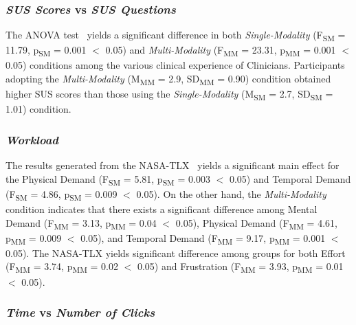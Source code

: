 \subsubsection{\textit{SUS Scores} vs \textit{SUS Questions}}

The ANOVA test\footnotemark[3]~\cite{Wobbrock:2011:ART:1978942.1978963} yields a significant difference in both \textit{Single-Modality} (F\textsubscript{SM} = 11.79, p\textsubscript{SM} = 0.001 $<$ 0.05) and \textit{Multi-Modality} (F\textsubscript{MM} = 23.31, p\textsubscript{MM} = 0.001 $<$ 0.05) conditions among the various clinical experience of Clinicians.
Participants adopting the \textit{Multi-Modality} (M\textsubscript{MM} = 2.9, SD\textsubscript{MM} = 0.90) condition obtained higher SUS scores than those using the \textit{Single-Modality} (M\textsubscript{SM} = 2.7, SD\textsubscript{SM} = 1.01) condition.


\subsubsection{\textit{Workload}}

The results generated from the NASA-TLX~\cite{10.1145/3290605.3300592} yields a significant main effect for the Physical Demand (F\textsubscript{SM} = 5.81, p\textsubscript{SM} = 0.003 $<$ 0.05) and Temporal Demand (F\textsubscript{SM} = 4.86, p\textsubscript{SM} = 0.009 $<$ 0.05).
On the other hand, the \textit{Multi-Modality} condition indicates that there exists a significant difference among Mental Demand (F\textsubscript{MM} = 3.13, p\textsubscript{MM} = 0.04 $<$ 0.05), Physical Demand (F\textsubscript{MM} = 4.61, p\textsubscript{MM} = 0.009 $<$ 0.05), and Temporal Demand (F\textsubscript{MM} = 9.17, p\textsubscript{MM} = 0.001 $<$ 0.05).
The NASA-TLX yields significant difference among groups for both Effort (F\textsubscript{MM} = 3.74, p\textsubscript{MM} = 0.02 $<$ 0.05) and Frustration (F\textsubscript{MM} = 3.93, p\textsubscript{MM} = 0.01 $<$ 0.05).

\balance

\subsubsection{\textit{Time} vs \textit{Number of Clicks}}

